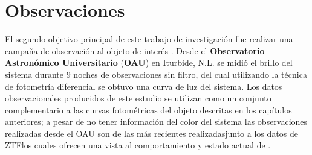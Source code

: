 \chapter{Observaciones}

El segundo objetivo principal de este trabajo de investigación fue realizar una
campaña de observación al objeto de interés \atoObjId. Desde el
\textbf{Observatorio Astronómico Universitario} (\textbf{OAU}) en Iturbide, N.L.
se midió el brillo del sistema durante 9 noches de observaciones sin filtro, del
cual utilizando la técnica de fotometría diferencial se obtuvo una curva de luz
del sistema. Los datos observacionales producidos de este estudio se utilizan
como un conjunto complementario a las curvas fotométricas del objeto descritas
en los capítulos anteriores; a pesar de no tener información del color del
sistema las observaciones realizadas desde el OAU son de las más recientes
realizadas\textemdash junto a los datos de ZTF\textemdash los cuales ofrecen una
vista al comportamiento y estado actual de \atoObjIdNoSpace.


